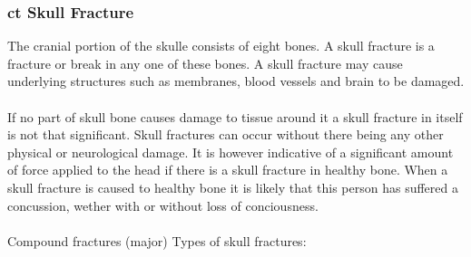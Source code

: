 \documentclass[11pt]{article}
\begin{document}
\subsubsection{\gls{ct} Skull Fracture}
The cranial portion of the skulle consists of eight bones. A skull fracture is a fracture or break in any one of these bones. A skull fracture may cause underlying structures such as membranes, blood vessels and brain to be damaged.\cite{SkullFracture2020}\\
\\
If no part of skull bone causes damage to tissue around it a skull fracture in itself is not that significant. Skull fractures can occur without there being any other physical or neurological damage. It is however indicative of a significant amount of force applied to the head if there is a skull fracture in healthy bone. When a skull fracture is caused to healthy bone it is likely that this person has suffered a concussion, wether with or without loss of conciousness.\cite{SkullFracture2020}\\
\\
Compound fractures
(major) Types of skull fractures:
\end{document}
